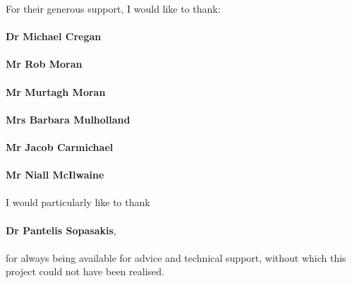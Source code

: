 For their generous support, I would like to thank:\\
\vspace{-0.5em}\\
\textbf{Dr Michael Cregan}\\
\vspace{-0.5em}\\
\textbf{Mr Rob Moran}\\
\vspace{-0.5em}\\
\textbf{Mr Murtagh Moran}\\
\vspace{-0.5em}\\
\textbf{Mrs Barbara Mulholland}\\
\vspace{-0.5em}\\
\textbf{Mr Jacob Carmichael}\\
\vspace{-0.5em}\\
\textbf{Mr Niall McIlwaine}\\
\vspace{2em}\\
I would particularly like to thank\\
\vspace{-0.5em}\\
\textbf{Dr Pantelis Sopasakis},\\
\vspace{-0.5em}\\
for always being available for advice and technical support, without which this project could not have been realised.